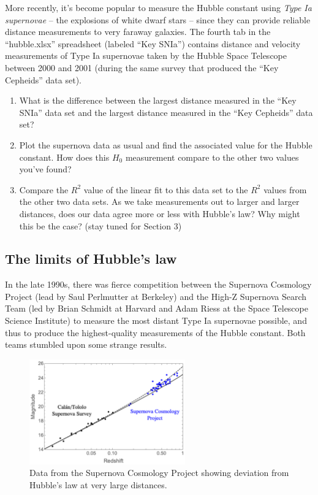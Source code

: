 \documentclass[11pt]{article}
\begin{document}
More recently, it's become popular to measure the Hubble constant using \emph{Type Ia supernovae} -- the explosions of white dwarf stars -- since they can provide reliable distance measurements to very faraway galaxies. The fourth tab in the ``hubble.xlsx'' spreadsheet (labeled ``Key SNIa'') contains distance and velocity measurements of Type Ia supernovae taken by the Hubble Space Telescope between 2000 and 2001 (during the same survey that produced the ``Key Cepheids'' data set). 

\begin{enumerate}[resume]
    \item What is the difference between the largest distance measured in the ``Key SNIa'' data set and the largest distance measured in the ``Key Cepheids'' data set?
    
    \item Plot the supernova data as usual and find the associated value for the Hubble constant. How does this $H_0$ measurement compare to the other two values you've found?
    
    \item Compare the $R^2$ value of the linear fit to this data set to the $R^2$ values from the other two data sets. As we take measurements out to larger and larger distances, does our data agree more or less with Hubble's law? Why might this be the case? (stay tuned for Section 3)
\end{enumerate}


\subsection{The limits of Hubble's law}

In the late 1990s, there was fierce competition between the Supernova Cosmology Project (lead by Saul Perlmutter at Berkeley) and the High-Z Supernova Search Team (led by Brian Schmidt at Harvard and Adam Riess at the Space Telescope Science Institute) to measure the most distant Type Ia supernovae possible, and thus to produce the highest-quality measurements of the Hubble constant. Both teams stumbled upon some strange results.

\begin{figure}[h!]
    \centering
    \includegraphics[width=0.6\textwidth]{acceleration2.PNG}
    \caption{Data from the Supernova Cosmology Project showing deviation from Hubble's law at very large distances.}
    \label{fig:acceleration}
\end{figure}
\end{document}
